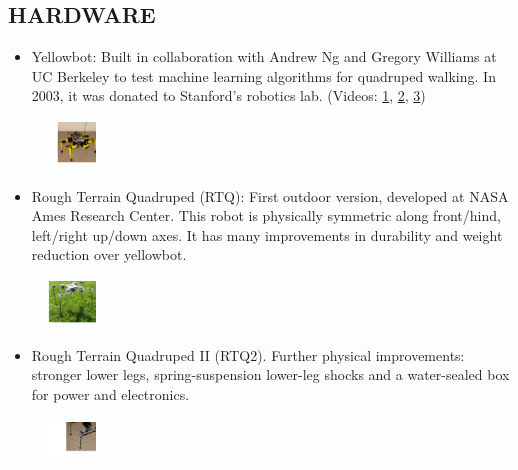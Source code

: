\documentclass[conference,lettersize,twocolumn,twosize]{./IEEEtran}
\begin{document}
\subsection*{HARDWARE}
\begin{itemize}
\item{Yellowbot: Built in collaboration with Andrew Ng and Gregory
  Williams at UC Berkeley to test machine learning algorithms for
  quadruped walking.  In 2003, it was donated to Stanford's robotics
  lab.  (Videos: \href{https://www.youtube.com/watch?v=nOca5QXBuTQ}{1},
  \href{https://www.youtube.com/watch?v=\_Dw67QpAlhU}{2}, 
  \href{https://www.youtube.com/watch?v=rp31BvijiqU}{3})}
\end{itemize}
\begin{figure}[ht]
  \centering      
  \includegraphics[height=0.5in,width=0.5in]{yellowbot.pdf}
\end{figure}
\begin{itemize}
\item{Rough Terrain Quadruped (RTQ): First outdoor version, developed
  at NASA Ames Research Center.  This robot is physically symmetric
  along front/hind, left/right up/down axes. It has many improvements
  in durability and weight reduction over yellowbot.}
\end{itemize}
\begin{figure}[ht]
  \centering      
  \includegraphics[height=0.5in,width=0.5in]{rtq.pdf}
\end{figure}
\begin{itemize}
\item{Rough Terrain Quadruped II (RTQ2).  Further physical
  improvements: stronger lower legs, spring-suspension lower-leg
  shocks and a water-sealed box for power and electronics.}
\end{itemize}
\begin{figure}[ht]
  \centering      
  \includegraphics[height=0.5in,width=0.5in]{mountainbot.pdf}
\end{figure}
\end{document}
